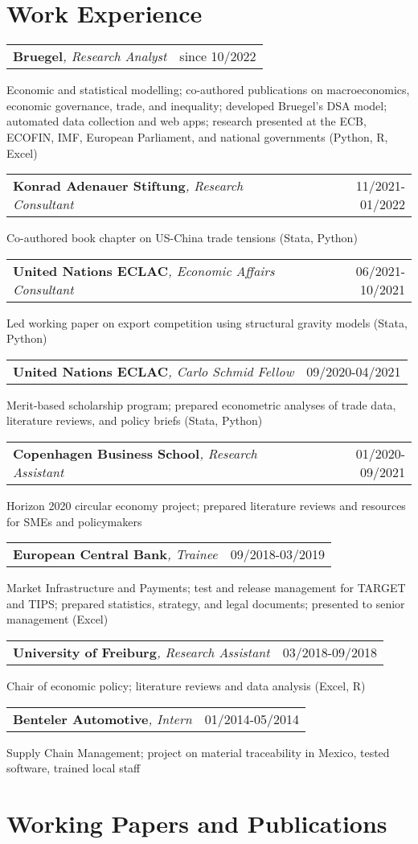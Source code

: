 \documentclass[A4,11pt]{article}
\makeatletter
\newcommand{\Subheading}[4]{   
    \begin{tabular*}{\textwidth}[t]{@{}l @{\extracolsep{\fill}} r@{}}
        \textbf{#1}\textit{\small #2} & \footnotesize #3 \\
    \end{tabular*}
    \small #4 
    \vspace{7pt}
}
\makeatother
\begin{document}
\section{Work Experience}

    \Subheading
        {Bruegel}{, Research Analyst}{since 10/2022}
        {Economic and statistical modelling; co-authored publications on macroeconomics, 
        economic governance, trade, and inequality; 
        developed Bruegel's DSA model; 
        automated data collection and web apps;
        research presented at the ECB, ECOFIN, IMF, European Parliament, and national governments 
        (Python, R, Excel)}

    \Subheading
        {Konrad Adenauer Stiftung}{, Research Consultant}{11/2021-01/2022}
        {Co-authored book chapter on US-China trade tensions 
        (Stata, Python)}  

    \Subheading
        {United Nations ECLAC}{, Economic Affairs Consultant}{06/2021-10/2021}
        {Led working paper on export competition using structural gravity models (Stata, Python)}

    \Subheading
        {United Nations ECLAC}{, Carlo Schmid Fellow}{09/2020-04/2021}
        {Merit-based scholarship program; prepared econometric analyses of trade data, 
        literature reviews, and policy briefs (Stata, Python)}

    \Subheading
        {Copenhagen Business School}{, Research Assistant}{01/2020-09/2021}
        {Horizon 2020 circular economy project; prepared literature reviews and 
        resources for SMEs and policymakers}

    \Subheading
        {European Central Bank}{, Trainee}{09/2018-03/2019}
        {Market Infrastructure and Payments; test and release management for TARGET 
        and TIPS; prepared statistics, strategy, and legal documents;
        presented to senior management (Excel)}

    \Subheading
        {University of Freiburg}{, Research Assistant}{03/2018-09/2018}
        {Chair of economic policy; literature reviews and data analysis (Excel, R)}

    \Subheading
        {Benteler Automotive}{, Intern}{01/2014-05/2014}
        {Supply Chain Management; project on material traceability in Mexico, 
        tested software, trained local staff}

\newpage

\section{Working Papers and Publications}
\setlength{}
\begin{refsection}
\nocite{*}
\printbibliography[heading=none]
\end{refsection}
\end{document}
